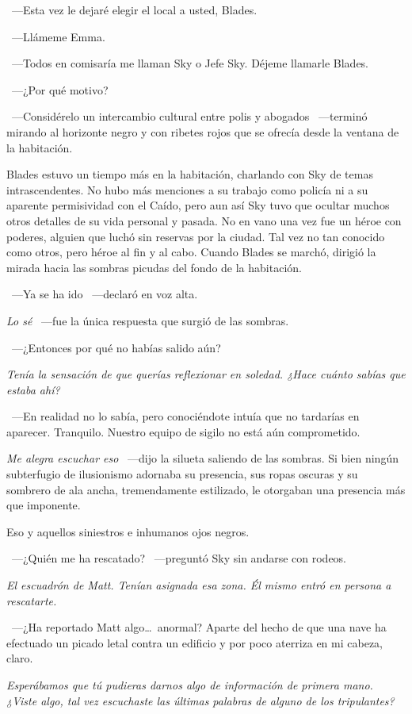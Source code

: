 ~---Esta vez le dejaré elegir el local a usted, Blades.

~---Llámeme Emma.

~---Todos en comisaría me llaman Sky o Jefe Sky. Déjeme llamarle Blades.

~---¿Por qué motivo?

~---Considérelo un intercambio cultural entre polis y abogados ~---terminó mirando al horizonte negro y con ribetes rojos que se ofrecía desde la ventana de la habitación.

\bigskip\noindent
Blades estuvo un tiempo más en la habitación, charlando con Sky de temas intrascendentes. No hubo más menciones a su trabajo como policía ni a su aparente permisividad con el Caído, pero aun así Sky tuvo que ocultar muchos otros detalles de su vida personal y pasada. No en vano una vez fue un héroe con poderes, alguien que luchó sin reservas por la ciudad. Tal vez no tan conocido como otros, pero héroe al fin y al cabo.
Cuando Blades se marchó, dirigió la mirada hacia las sombras picudas del fondo de la habitación.

~---Ya se ha ido ~---declaró en voz alta.

\emph{Lo sé} ~---fue la única respuesta que surgió de las sombras.

~---¿Entonces por qué no habías salido aún?

\emph{Tenía la sensación de que querías reflexionar en soledad. ¿Hace cuánto sabías que estaba ahí?}

~---En realidad no lo sabía, pero conociéndote intuía que no tardarías en aparecer. Tranquilo. Nuestro equipo de sigilo no está aún comprometido.

\emph{Me alegra escuchar eso} ~---dijo la silueta saliendo de las sombras. Si bien ningún subterfugio de ilusionismo adornaba su presencia, sus ropas oscuras y su sombrero de ala ancha, tremendamente estilizado, le otorgaban una presencia más que imponente.

Eso y aquellos siniestros e inhumanos ojos negros.

~---¿Quién me ha rescatado? ~---preguntó Sky sin andarse con rodeos.

\emph{El escuadrón de Matt. Tenían asignada esa zona. Él mismo entró en persona a rescatarte.}

~---¿Ha reportado Matt algo\dots\ anormal? Aparte del hecho de que una nave ha efectuado un picado letal contra un edificio y por poco aterriza en mi cabeza, claro.

\emph{Esperábamos que tú pudieras darnos algo de información de primera mano. ¿Viste algo, tal vez escuchaste las últimas palabras de alguno de los tripulantes?}

